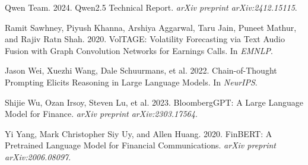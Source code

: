 \documentclass[11pt]{article}
\begin{document}
\begin{thebibliography}{}
Qwen Team. 2024.
Qwen2.5 Technical Report.
\textit{arXiv preprint arXiv:2412.15115}.

Ramit Sawhney, Piyush Khanna, Arshiya Aggarwal, Taru Jain, Puneet Mathur, and Rajiv Ratn Shah. 2020.
VolTAGE: Volatility Forecasting via Text Audio Fusion with Graph Convolution Networks for Earnings Calls.
In \textit{EMNLP}.

Jason Wei, Xuezhi Wang, Dale Schuurmans, et al. 2022.
Chain-of-Thought Prompting Elicits Reasoning in Large Language Models.
In \textit{NeurIPS}.

Shijie Wu, Ozan Irsoy, Steven Lu, et al. 2023.
BloombergGPT: A Large Language Model for Finance.
\textit{arXiv preprint arXiv:2303.17564}.

Yi Yang, Mark Christopher Siy Uy, and Allen Huang. 2020.
FinBERT: A Pretrained Language Model for Financial Communications.
\textit{arXiv preprint arXiv:2006.08097}.

\end{thebibliography}
\endgroup
\end{document}
